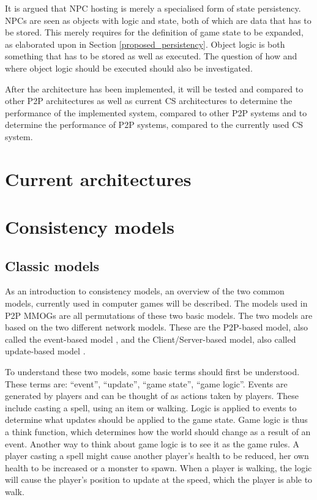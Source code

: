 \documentclass[journal,oneside,a4paper,onecolumn]{IEEEtran}
\begin{document}
It is argued that NPC hosting is merely a specialised form of state persistency. NPCs are seen as objects with logic and state, both of which are data that has to be stored. This merely requires for the definition of game state to be expanded, as elaborated upon in Section \ref{proposed_persistency}. Object logic is both something that has to be stored as well as executed. The question of how and where object logic should be executed should also be investigated.

After the architecture has been implemented, it will be tested and compared to other P2P architectures as well as current \ac{CS} architectures to determine the performance of the implemented system, compared to other P2P systems and to determine the performance of P2P systems, compared to the currently used \ac{CS} system.

\section{Current architectures}
\label{current_architectures}


\section{Consistency models}
\label{consistency_models}

\subsection{Classic models}

As an introduction to consistency models, an overview of the two common models, currently used in computer games will be described. The models used in P2P MMOGs are all permutations of these two basic models. The two models are based on the two different network models. These are the P2P-based model, also called the event-based model \cite{p2p_cm_aoe}, and the Client/Server-based model, also called update-based model \cite{unreal_networking}.

To understand these two models, some basic terms should first be understood. These terms are: ``event'', ``update'', ``game state'', ``game logic''. Events are generated by players and can be thought of as actions taken by players. These include casting a spell, using an item or walking. Logic is applied to events to determine what updates should be applied to the game state. Game logic is thus a think function, which determines how the world should change as a result of an event. Another way to think about game logic is to see it as the game rules. A player casting a spell might cause another player's health to be reduced, her own health to be increased or a monster to spawn. When a player is walking, the logic will cause the player's position to update at the speed, which the player is able to walk.
\end{document}

